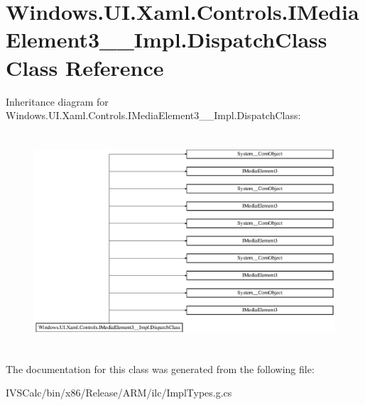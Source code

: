 \hypertarget{class_windows_1_1_u_i_1_1_xaml_1_1_controls_1_1_i_media_element3_____impl_1_1_dispatch_class}{}\section{Windows.\+U\+I.\+Xaml.\+Controls.\+I\+Media\+Element3\+\_\+\+\_\+\+Impl.\+Dispatch\+Class Class Reference}
\label{class_windows_1_1_u_i_1_1_xaml_1_1_controls_1_1_i_media_element3_____impl_1_1_dispatch_class}
Inheritance diagram for Windows.\+U\+I.\+Xaml.\+Controls.\+I\+Media\+Element3\+\_\+\+\_\+\+Impl.\+Dispatch\+Class\+:\begin{figure}[H]
\begin{center}
\leavevmode
\includegraphics[height=8.083990cm]{class_windows_1_1_u_i_1_1_xaml_1_1_controls_1_1_i_media_element3_____impl_1_1_dispatch_class}
\end{center}
\end{figure}


The documentation for this class was generated from the following file\+:\begin{DoxyCompactItemize}
\item 
I\+V\+S\+Calc/bin/x86/\+Release/\+A\+R\+M/ilc/Impl\+Types.\+g.\+cs\end{DoxyCompactItemize}
